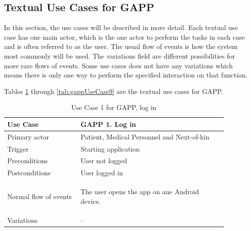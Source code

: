\subsection{Textual Use Cases for GAPP}
\label{sec:textualusecasesgapp}
In this section, the use cases will be described in more detail. Each textual use case has one 
main actor, which is the one actor to perform the tasks in each case and is often referred to 
as the user. The usual flow of events is how the system most commonly will be used. The variations 
field are different possibilities for more rare flows of events. Some use cases does not have 
any variations which means there is only one way to perform the specified interaction on that function.

Tables \ref{tab:gappUseCase1} through \ref{tab:gappUseCase9} are the textual use cases for GAPP.

\begin{table}
	\begin{center}
	    \begin{tabular}{|p{0.3\linewidth}|p{0.6\linewidth}|}
	    \hline
		    Use Case &  GAPP 1. Log in \\ \hline
		    Primary actor & Patient, Medical Personnel and Next-of-kin \\ \hline
		    Trigger & Starting application \\ \hline
		    Preconditions & User not logged \\ \hline
		    Postconditions & User logged in \\ \hline
		    Normal flow of events &
		    	\begin{tabulenum}
		    	  \item The user opens the app on ane Android device.
		    	\end{tabulenum} \\ \hline
		    Variations & -- \\ \hline
	    \end{tabular}
    \end{center}
    \caption{Use Case 1 for GAPP, log in}
    \label{tab:gappUseCase1}
\end{table}

